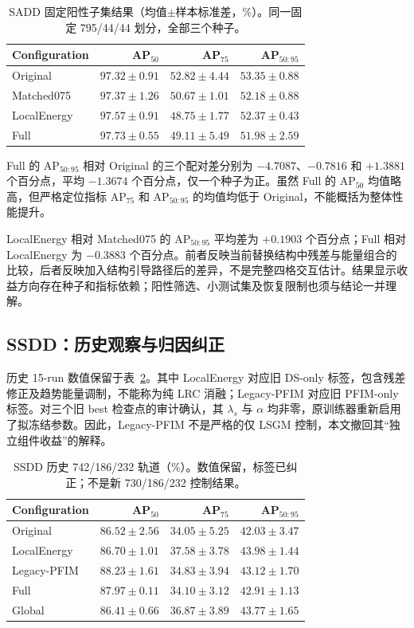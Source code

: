 \begin{table}[!t]
\centering\small
\setlength{\tabcolsep}{3pt}
\caption{SADD 固定阳性子集结果（均值$\pm$样本标准差，\%）。同一固定 795/44/44 划分，全部三个种子。}
\label{tab:sadd_current}
\begin{tabular}{lrrr}
\toprule
Configuration & AP$_{50}$ & AP$_{75}$ & AP$_{50:95}$\\
\midrule
Original & $97.32\pm0.91$ & $52.82\pm4.44$ & $53.35\pm0.88$ \\
Matched075 & $97.37\pm1.26$ & $50.67\pm1.01$ & $52.18\pm0.88$ \\
LocalEnergy & $97.57\pm0.91$ & $48.75\pm1.77$ & $52.37\pm0.43$ \\
Full & $97.73\pm0.55$ & $49.11\pm5.49$ & $51.98\pm2.59$ \\
\bottomrule
\end{tabular}
\end{table}

Full 的 AP$_{50:95}$ 相对 Original 的三个配对差分别为 $-4.7087$、$-0.7816$ 和 $+1.3881$ 个百分点，平均 $-1.3674$ 个百分点，仅一个种子为正。虽然 Full 的 AP$_{50}$ 均值略高，但严格定位指标 AP$_{75}$ 和 AP$_{50:95}$ 的均值均低于 Original，不能概括为整体性能提升。

LocalEnergy 相对 Matched075 的 AP$_{50:95}$ 平均差为 $+0.1903$ 个百分点；Full 相对 LocalEnergy 为 $-0.3883$ 个百分点。前者反映当前替换结构中残差与能量组合的比较，后者反映加入结构引导路径后的差异，不是完整四格交互估计。结果显示收益方向存在种子和指标依赖；阳性筛选、小测试集及恢复限制也须与结论一并理解。
\FloatBarrier

\subsection{SSDD：历史观察与归因纠正}
历史 15-run 数值保留于表~\ref{tab:ssdd_legacy}。其中 LocalEnergy 对应旧 DS-only 标签，包含残差修正及趋势能量调制，不能称为纯 LRC 消融；Legacy-PFIM 对应旧 PFIM-only 标签。对三个旧 best 检查点的审计确认，其 $\lambda_s$ 与 $\alpha$ 均非零，原训练器重新启用了拟冻结参数。因此，Legacy-PFIM 不是严格的仅 LSGM 控制，本文撤回其“独立组件收益”的解释。

\begin{table}[!t]
\centering\small
\setlength{\tabcolsep}{3pt}
\caption{SSDD 历史 742/186/232 轨道（\%）。数值保留，标签已纠正；不是新 730/186/232 控制结果。}
\label{tab:ssdd_legacy}
\begin{tabular}{lrrr}
\toprule
Configuration & AP$_{50}$ & AP$_{75}$ & AP$_{50:95}$\\
\midrule
Original & $86.52\pm2.56$ & $34.05\pm5.25$ & $42.03\pm3.47$\\
LocalEnergy & $86.70\pm1.01$ & $37.58\pm3.78$ & $43.98\pm1.44$\\
Legacy-PFIM & $88.23\pm1.61$ & $34.83\pm3.94$ & $43.12\pm1.70$\\
Full & $87.97\pm0.11$ & $34.10\pm3.12$ & $42.91\pm1.13$\\
Global & $86.41\pm0.66$ & $36.87\pm3.89$ & $43.77\pm1.65$\\
\bottomrule
\end{tabular}
\end{table}

